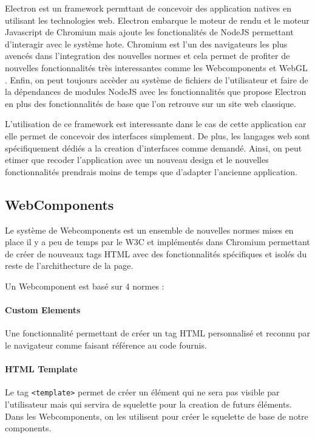 Electron est un framework permttant de concevoir des application natives en utilisant les technologies web.
Electron embarque le moteur de rendu et le moteur Javascript de Chromium mais ajoute les fonctionalités de NodeJS permettant d'interagir avec le système hote.
Chromium est l'un des navigateurs les plus avencés dans l'integration des nouvelles normes et cela permet de profiter de nouvelles fonctionnalités très interessantes comme les Webcomponents et WebGL .
Enfin, on peut toujours accèder au système de fichiers de l'utilisateur et faire de la dépendances de modules NodeJS avec les fonctionnalités que propose Electron en plus des fonctionnalités de base que l'on retrouve sur un site web classique.

L'utilisation de ce framework est interessante dans le cas de cette application car elle permet de concevoir des interfaces simplement.
De plus, les langages web sont spécifiquement dédiés a la creation d'interfaces comme demandé.
Ainsi, on peut etimer que recoder l'application avec un nouveau design et le nouvelles fonctionnalités prendrais moins de temps que d'adapter l'ancienne application.

\subsection{WebComponents}

Le système de Webcomponents est un ensemble de nouvelles normes mises en place il y a peu de temps par le W3C et implémentés dans Chromium permettant de créer de nouveaux tags HTML avec des fonctionnalités spécifiques et isolés du reste de l'archithecture de la page.

Un Webcomponent est basé sur 4 normes :

\paragraph{Custom Elements} Une fonctionnalité permettant de créer un tag HTML personnalisé et reconnu par le navigateur comme faisant référence au code fournis.

\paragraph{HTML Template} Le tag \texttt{<template>} permet de créer un élément qui ne sera pas visible par l'utilisateur mais qui servira de squelette pour la creation de futurs éléments.
Dans les Webcomponents, on les utilisent pour créer le squelette de base de notre components.

